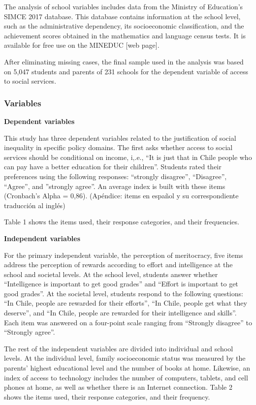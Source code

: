 \documentclass[
  letterpaper,
  DIV=11,
  numbers=noendperiod]{scrartcl}
\begin{document}
The analysis of school variables includes data from the Ministry of
Education's SIMCE 2017 database. This database contains information at
the school level, such as the administrative dependency, its
socioeconomic classification, and the achievement scores obtained in the
mathematics and language census tests. It is available for free use on
the MINEDUC {[}web page{]}.

After eliminating missing cases, the final sample used in the analysis
was based on 5,047 students and parents of 231 schools for the dependent
variable of access to social services.

\hypertarget{variables}{%
\subsubsection{Variables}\label{variables}}

\textbf{Dependent variables}

This study has three dependent variables related to the justification of
social inequality in specific policy domains. The first asks whether
access to social services should be conditional on income, i,.e., ``It
is just that in Chile people who can pay have a better education for
their children''. Students rated their preferences using the following
responses: ``strongly disagree'', ``Disagree'', ``Agree'', and
''strongly agree''. An average index is built with these items
(Cronbach's Alpha = 0,86). (Apéndice: items en español y su
correspondiente traducción al inglés)

Table 1 shows the items used, their response categories, and their
frequencies.

\textbf{Independent variables}

For the primary independent variable, the perception of meritocracy,
five items address the perception of rewards according to effort and
intelligence at the school and societal levels. At the school level,
students answer whether ``Intelligence is important to get good grades''
and ``Effort is important to get good grades''. At the societal level,
students respond to the following questions: ``In Chile, people are
rewarded for their efforts'', ``In Chile, people get what they
deserve'', and ``In Chile, people are rewarded for their intelligence
and skills''. Each item was answered on a four-point scale ranging from
``Strongly disagree'' to ``Strongly agree''.

The rest of the independent variables are divided into individual and
school levels. At the individual level, family socioeconomic status was
measured by the parents' highest educational level and the number of
books at home. Likewise, an index of access to technology includes the
number of computers, tablets, and cell phones at home, as well as
whether there is an Internet connection. Table 2 shows the items used,
their response categories, and their frequency.
\end{document}
